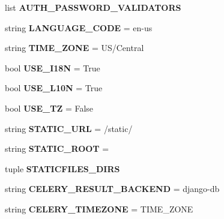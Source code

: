 \begin{DoxyCompactItemize}
\item 
list {\bfseries A\+U\+T\+H\+\_\+\+P\+A\+S\+S\+W\+O\+R\+D\+\_\+\+V\+A\+L\+I\+D\+A\+T\+O\+RS}
\item 
\mbox{\label{namespacebackend_1_1settings_a82b4e5fa5f9878eb8eb6d4e2b9a5aa57}} 
string {\bfseries L\+A\+N\+G\+U\+A\+G\+E\+\_\+\+C\+O\+DE} = \textquotesingle{}en-\/us\textquotesingle{}
\item 
\mbox{\label{namespacebackend_1_1settings_a13354d4aa67236c88e975638a96a2573}} 
string {\bfseries T\+I\+M\+E\+\_\+\+Z\+O\+NE} = \textquotesingle{}US/Central\textquotesingle{}
\item 
\mbox{\label{namespacebackend_1_1settings_a5e03f924d612d88ec8424822657cdba8}} 
bool {\bfseries U\+S\+E\+\_\+\+I18N} = True
\item 
\mbox{\label{namespacebackend_1_1settings_abda3393fdd330c33a2dd9c3110f761ba}} 
bool {\bfseries U\+S\+E\+\_\+\+L10N} = True
\item 
\mbox{\label{namespacebackend_1_1settings_adf4d9a2d2263ad330175312e8c374c22}} 
bool {\bfseries U\+S\+E\+\_\+\+TZ} = False
\item 
\mbox{\label{namespacebackend_1_1settings_a03384aee4de0f3fd6616dc36a9137a0b}} 
string {\bfseries S\+T\+A\+T\+I\+C\+\_\+\+U\+RL} = \textquotesingle{}/static/\textquotesingle{}
\item 
\mbox{\label{namespacebackend_1_1settings_a7efa7bb71688b1885b79db1fe62cc408}} 
string {\bfseries S\+T\+A\+T\+I\+C\+\_\+\+R\+O\+OT} = \textquotesingle{}\textquotesingle{}
\item 
tuple {\bfseries S\+T\+A\+T\+I\+C\+F\+I\+L\+E\+S\+\_\+\+D\+I\+RS}
\item 
\mbox{\label{namespacebackend_1_1settings_aa08fe67add790c67b31b734d6ef16fd5}} 
string {\bfseries C\+E\+L\+E\+R\+Y\+\_\+\+R\+E\+S\+U\+L\+T\+\_\+\+B\+A\+C\+K\+E\+ND} = \textquotesingle{}django-\/db\textquotesingle{}
\item 
\mbox{\label{namespacebackend_1_1settings_a4a07cc0b71edbd0e125a12e679185e13}} 
string {\bfseries C\+E\+L\+E\+R\+Y\+\_\+\+T\+I\+M\+E\+Z\+O\+NE} = T\+I\+M\+E\+\_\+\+Z\+O\+NE
\end{DoxyCompactItemize}


